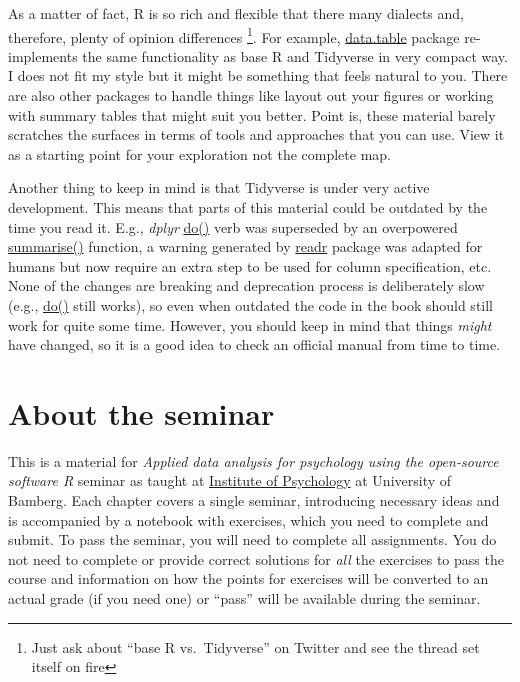 \documentclass[
]{book}
\begin{document}
As a matter of fact, R is so rich and flexible that there many dialects and, therefore, plenty of opinion differences \footnote{Just ask about ``base R vs.~Tidyverse'' on Twitter and see the thread set itself on fire}. For example, \href{https://github.com/Rdatatable/data.table}{data.table} package re-implements the same functionality as base R and Tidyverse in very compact way. I does not fit my style but it might be something that feels natural to you. There are also other packages to handle things like layout out your figures or working with summary tables that might suit you better. Point is, these material barely scratches the surfaces in terms of tools and approaches that you can use. View it as a starting point for your exploration not the complete map.

Another thing to keep in mind is that Tidyverse is under very active development. This means that parts of this material could be outdated by the time you read it. E.g., \emph{dplyr} \href{https://dplyr.tidyverse.org/reference/do.html}{do()} verb was superseded by an overpowered \href{https://dplyr.tidyverse.org/reference/summarise.html}{summarise()} function, a warning generated by \href{https://readr.tidyverse.org/}{readr} package was adapted for humans but now require an extra step to be used for column specification, etc. None of the changes are breaking and deprecation process is deliberately slow (e.g., \href{https://dplyr.tidyverse.org/reference/do.html}{do()} still works), so even when outdated the code in the book should still work for quite some time. However, you should keep in mind that things \emph{might} have changed, so it is a good idea to check an official manual from time to time.

\hypertarget{about-the-seminar}{%
\section*{About the seminar}\label{about-the-seminar}}

This is a material for \emph{Applied data analysis for psychology using the open-source software R} seminar as taught at \href{https://www.uni-bamberg.de/psychologie/}{Institute of Psychology} at University of Bamberg. Each chapter covers a single seminar, introducing necessary ideas and is accompanied by a notebook with exercises, which you need to complete and submit. To pass the seminar, you will need to complete all assignments. You do not need to complete or provide correct solutions for \emph{all} the exercises to pass the course and information on how the points for exercises will be converted to an actual grade (if you need one) or ``pass'' will be available during the seminar.
\end{document}
